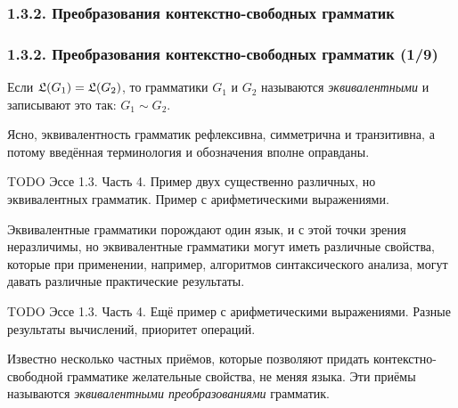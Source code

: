 \documentclass[mathserif,12pt,aspectratio=169]{beamer}
\renewcommand{\index}[1]{}
\def\odmkey#1#2{{\it\color{red} #1}\index{#2}}
\def\TODO#1{{\color{gray} TODO {#1}}}
\begin{document}
\subsubsection{1.3.2. Преобразования контекстно-свободных грамматик}\label{1.3.2.}
\begin{frame}
\frametitle{1.3.2. Преобразования контекстно-свободных грамматик (1/9)}


Если $\frak{L}(G_1)=\frak{L}(G_2)$, 
то грамматики 
$G_1$ и $G_2$
называются \odmkey{эквивалентными}{Грамматика!эквивалентная} и записывают это так:
$G_1\sim G_2$.

\begin{remark}
Ясно, эквивалентность грамматик 
рефлексивна, симметрична и транзитивна,
а потому введённая терминология и обозначения
вполне оправданы.
\end{remark}

\medskip
\TODO{Эссе 1.3. Часть 4. Пример двух существенно различных, но эквивалентных
грамматик. Пример с арифметическими выражениями.
}

\medskip
Эквивалентные грамматики
порождают один язык, и с этой точки зрения
неразличимы, 
но эквивалентные грамматики
могут иметь различные свойства,
которые при применении, 
например, алгоритмов синтаксического 
анализа, могут давать различные практические результаты.   

\medskip
\TODO{ Эссе 1.3. Часть 4. Ещё пример с арифметическими выражениями.
Разные результаты вычислений, приоритет операций. 
}

Известно несколько частных приёмов,
которые позволяют придать
контекстно-свободной грамматике
желательные свойства, не меняя языка.
Эти приёмы называются
\odmkey{эквивалентными преобразованиями}{Преобразование!эквивалентное!грамматик}
грамматик.
\end{frame}
\end{document}
